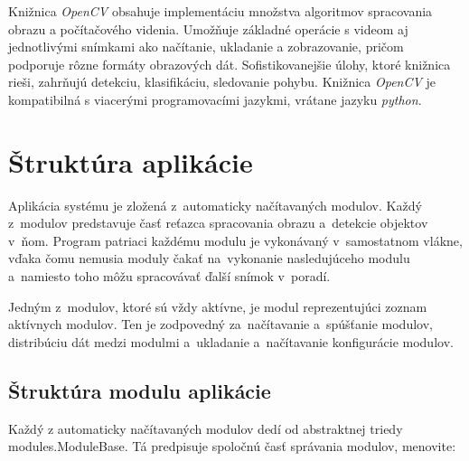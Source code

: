        Knižnica \emph{OpenCV} obsahuje implementáciu množstva algoritmov spracovania obrazu a počítačového videnia. Umožňuje základné operácie s videom aj jednotlivými snímkami ako načítanie, ukladanie a zobrazovanie, pričom podporuje rôzne formáty obrazových dát. Sofistikovanejšie úlohy, ktoré knižnica rieši, zahrňujú detekciu, klasifikáciu, sledovanie pohybu. Knižnica \emph{OpenCV} je kompatibilná s viacerými programovacími jazykmi, vrátane jazyku \emph{python}.

    \section{Štruktúra aplikácie}
        Aplikácia systému je zložená z~automaticky načítavaných modulov. Každý z~modulov predstavuje časť reťazca spracovania obrazu a~detekcie objektov v~ňom. Program patriaci každému modulu je vykonávaný v~samostatnom vlákne, vďaka čomu nemusia moduly čakať na~vykonanie nasledujúceho modulu a~namiesto toho môžu spracovávať ďalší snímok v~poradí.

        Jedným z~modulov, ktoré sú vždy aktívne, je modul reprezentujúci zoznam aktívnych modulov. Ten je zodpovedný za~načítavanie a~spúšťanie modulov, distribúciu dát medzi modulmi a~ukladanie a~načítavanie konfigurácie modulov.
        \subsection{Štruktúra modulu aplikácie}
            Každý z automaticky načítavaných modulov dedí od abstraktnej triedy \\ modules.ModuleBase. Tá predpisuje spoločnú časť správania modulov, menovite:

